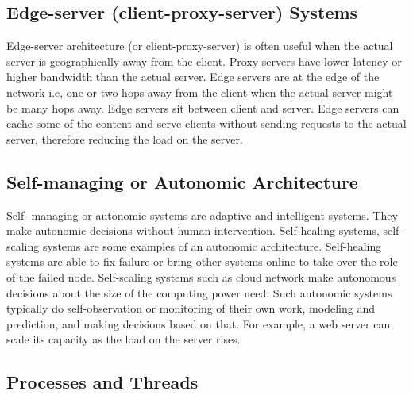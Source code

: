 \documentclass[twoside]{article}
\begin{document}
\subsection{Edge-server (client-proxy-server) Systems}
Edge-server architecture (or client-proxy-server) is often useful when the actual server is geographically away from the client. Proxy servers have lower latency or higher bandwidth than the actual server. Edge servers are at the edge of the network i.e, one or two hops away from the client when the actual server might be many hops away. Edge servers sit between client and server. Edge servers can cache some of the content and serve clients without sending requests to the actual server, therefore reducing the load on the server. \\
\subsection{Self-managing or Autonomic Architecture}
Self- managing or autonomic systems are adaptive and intelligent systems. They make autonomic decisions without human intervention. Self-healing systems, self-scaling systems are some examples of an autonomic architecture. Self-healing systems are able to fix failure or bring other systems online to take over the role of the failed node. Self-scaling systems such as cloud network make autonomous decisions about the size of the computing power need. Such autonomic systems typically do self-observation or monitoring of their own work, modeling and prediction, and making decisions based on that. For example, a web server can scale its capacity as the load on the server rises. 
\subsection{Processes and Threads}
\end{document}
